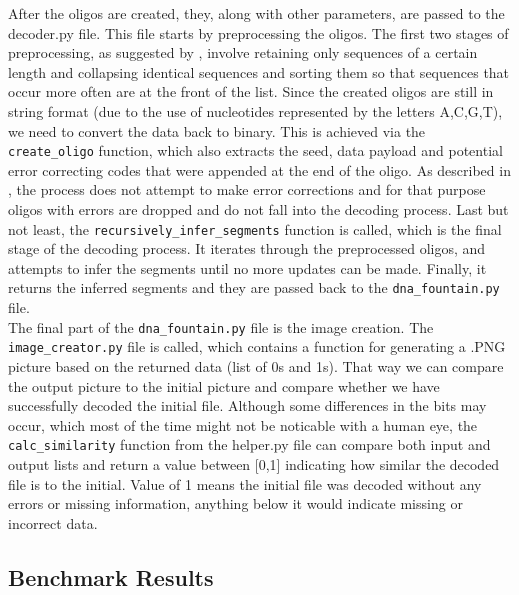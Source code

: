 \documentclass[12pt]%
{article}
\begin{document}
After the oligos are created, they, along with other parameters, are passed to the decoder.py file. This file starts by preprocessing the oligos. The first two stages of preprocessing, as suggested by \cite{erlich2017dnasupplementary}, involve retaining only sequences of a certain length and collapsing identical sequences and sorting them so that sequences that occur more often are at the front of the list. Since the created oligos are still in string format (due to the use of nucleotides represented by the letters A,C,G,T), we need to convert the data back to binary. This is achieved via the \texttt{create\_oligo} function, which also extracts the seed, data payload and potential error correcting codes that were appended at the end of the oligo. As described in \cite{erlich2017dna}, the process does not attempt to make error corrections and for that purpose oligos with errors are dropped and do not fall into the decoding process. Last but not least, the \texttt{recursively\_infer\_segments} function is called, which is the final stage of the decoding process. It iterates through the preprocessed oligos, and attempts to infer the segments until no more updates can be made. Finally, it returns the inferred segments and they are passed back to the \texttt{dna\_fountain.py} file. \\
The final part of the \texttt{dna\_fountain.py} file is the image creation. The \texttt{image\_creator.py} file is called, which contains a function for generating a .PNG picture based on the returned data (list of 0s and 1s). That way we can compare the output picture to the initial picture and compare whether we have successfully decoded the initial file. Although some differences in the bits may occur, which most of the time might not be noticable with a human eye, the \texttt{calc\_similarity} function from the helper.py file can compare both input and output lists and return a value between [0,1] indicating how similar the decoded file is to the initial. Value of 1 means the initial file was decoded without any errors or missing information, anything below it would indicate missing or incorrect data.


\subsection{Benchmark Results}\label{subsec:benchmark_results}
\end{document}
